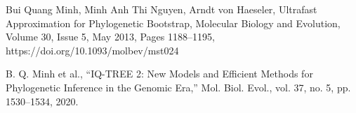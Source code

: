 \documentclass[12pt]{report}
\begin{document}
\begin{thebibliography}{10}
	Bui Quang Minh, Minh Anh Thi Nguyen, Arndt von Haeseler, Ultrafast Approximation for Phylogenetic Bootstrap, Molecular Biology and Evolution, Volume 30, Issue 5, May 2013, Pages 1188–1195, https://doi.org/10.1093/molbev/mst024
	
	B. Q. Minh et al., “IQ-TREE 2: New Models and Efficient Methods for Phylogenetic Inference in the Genomic Era,” Mol. Biol. Evol., vol. 37, no. 5, pp. 1530–1534, 2020.
	
\end{thebibliography}
\end{document}
